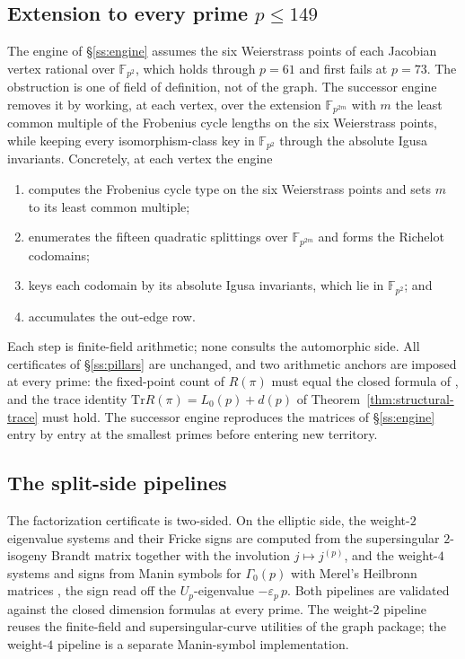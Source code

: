 \documentclass[10pt,a4paper]{amsart}
\newcommand{\F}{\mathbb{F}}
\newcommand{\Tr}{\mathrm{Tr}}
\newcommand{\eps}{\varepsilon}
\begin{document}
	\subsection{Extension to every prime $p\le149$}
	\label{ss:extension}
	
	The engine of \S\ref{ss:engine} assumes the six Weierstrass points of each
	Jacobian vertex rational over $\F_{p^2}$, which holds through $p=61$ and
	first fails at $p=73$. The obstruction is one of field of definition, not
	of the graph. The successor engine removes it by working, at each vertex,
	over the extension $\F_{p^{2m}}$ with $m$ the least common multiple of the
	Frobenius cycle lengths on the six Weierstrass points, while keeping every
	isomorphism-class key in $\F_{p^2}$ through the absolute Igusa invariants.
	Concretely, at each vertex the engine
	\begin{enumerate}[label=\textup{(\roman*)},leftmargin=2.4em]
		\item computes the Frobenius cycle type on the six Weierstrass points and
		sets $m$ to its least common multiple;
		\item enumerates the fifteen quadratic splittings over $\F_{p^{2m}}$ and
		forms the Richelot codomains;
		\item keys each codomain by its absolute Igusa invariants, which lie in
		$\F_{p^2}$; and
		\item accumulates the out-edge row.
	\end{enumerate}
	Each step is finite-field arithmetic; none consults the automorphic side.
	All certificates of \S\ref{ss:pillars} are unchanged, and two arithmetic
	anchors are imposed at every prime: the fixed-point count of $R(\pi)$ must
	equal the closed formula of \cite[Thm.~2, Rem.~3]{IbukiyamaKatsura}, and
	the trace identity $\Tr R(\pi)=L_0(p)+d(p)$ of
	Theorem~\ref{thm:structural-trace} must hold. The successor engine
	reproduces the matrices of \S\ref{ss:engine} entry by entry at the
	smallest primes before entering new territory.
	
	\subsection{The split-side pipelines}
	\label{ss:split-pipelines}
	
	The factorization certificate is two-sided. On the elliptic side, the
	weight-$2$ eigenvalue systems and their Fricke signs are computed from the
	supersingular $2$-isogeny Brandt matrix together with the involution
	$j\mapsto j^{(p)}$, and the weight-$4$ systems and signs from Manin
	symbols \cite{Manin1972,Cremona1997} for $\Gamma_0(p)$ with Merel's
	Heilbronn matrices \cite{Merel1994}, the sign read off the $U_p$-eigenvalue
	$-\eps_p\,p$. Both pipelines are validated against the closed dimension
	formulas at every prime. The weight-$2$ pipeline reuses the finite-field
	and supersingular-curve utilities of the graph package; the weight-$4$
	pipeline is a separate Manin-symbol implementation.
	
\end{document}

